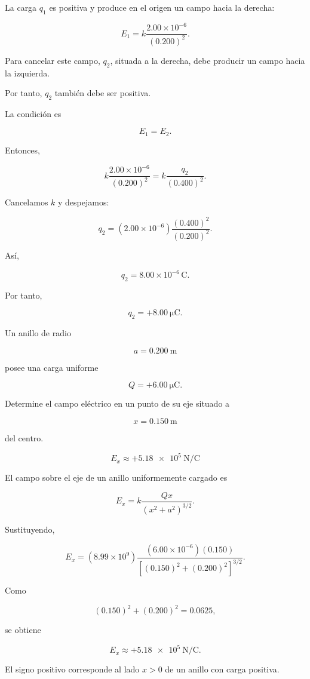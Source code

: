 \begin{explicacion}

La carga \(q_1\) es positiva y produce en el origen un campo hacia la derecha:

\[
E_1=k\frac{2.00\times10^{-6}}{(0.200)^2}.
\]

Para cancelar este campo, \(q_2\), situada a la derecha, debe producir un campo hacia la izquierda.

Por tanto, \(q_2\) también debe ser positiva.

La condición es

\[
E_1=E_2.
\]

Entonces,

\[
k\frac{2.00\times10^{-6}}{(0.200)^2}
=
k\frac{q_2}{(0.400)^2}.
\]

Cancelamos \(k\) y despejamos:

\[
q_2
=
(2.00\times10^{-6})
\frac{(0.400)^2}{(0.200)^2}.
\]

Así,

\[
q_2=8.00\times10^{-6}\,\si{\coulomb}.
\]

Por tanto,

\[
\boxed{q_2=+\SI{8.00}{\micro\coulomb}}.
\]

\end{explicacion}


\begin{ejercicio}

Un anillo de radio

\[
a=\SI{0.200}{\metre}
\]

posee una carga uniforme

\[
Q=+\SI{6.00}{\micro\coulomb}.
\]

Determine el campo eléctrico en un punto de su eje situado a

\[
x=\SI{0.150}{\metre}
\]

del centro.

\end{ejercicio}

\begin{respuesta}

\[
\boxed{E_x\approx+\SI{5.18e5}{\newton\per\coulomb}}
\]

\end{respuesta}

\begin{explicacion}

El campo sobre el eje de un anillo uniformemente cargado es

\[
E_x=k\frac{Qx}{(x^2+a^2)^{3/2}}.
\]

Sustituyendo,

\[
E_x=
(8.99\times10^9)
\frac{(6.00\times10^{-6})(0.150)}
{\left[(0.150)^2+(0.200)^2\right]^{3/2}}.
\]

Como

\[
(0.150)^2+(0.200)^2=0.0625,
\]

se obtiene

\[
\boxed{E_x\approx+\SI{5.18e5}{\newton\per\coulomb}}.
\]

El signo positivo corresponde al lado \(x>0\) de un anillo con carga positiva.

\end{explicacion}


